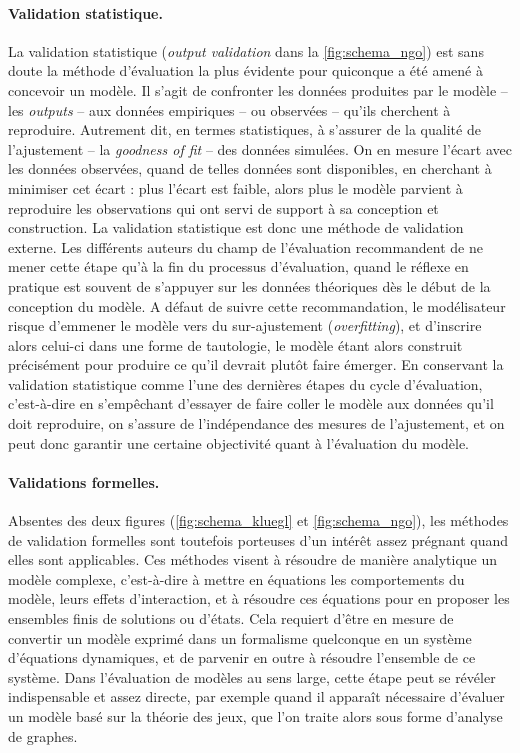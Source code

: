 \paragraph{Validation statistique.}
La validation statistique (\og \textit{output validation}\fg{} dans la \cref{fig:schema_ngo}) est sans doute la méthode d'évaluation la plus évidente pour quiconque a été amené à concevoir un modèle. Il s'agit de confronter les données produites par le modèle -- les \textit{outputs} --
aux données empiriques -- ou observées -- qu'ils cherchent à reproduire.
Autrement dit, en termes statistiques, à s'assurer de la qualité de l'ajustement -- la \textit{goodness of fit} -- des données simulées.
On en mesure l'écart avec les données observées, quand de telles données sont disponibles, en cherchant à minimiser cet écart :
	plus l'écart est faible, alors plus le modèle parvient à reproduire les observations qui ont servi de support à sa conception et construction.
La validation statistique est donc une méthode de validation externe.
Les différents auteurs du champ de l'évaluation recommandent de ne mener cette étape qu'à la fin du processus d'évaluation, quand le réflexe en pratique est souvent de s'appuyer sur les données théoriques dès le début de la conception du modèle.
A défaut de suivre cette recommandation, le modélisateur risque d'emmener le modèle vers du \og sur-ajustement \fg{} (\textit{overfitting}), et d'inscrire alors celui-ci dans une forme de tautologie, le modèle étant alors construit précisément pour produire ce qu'il devrait plutôt faire émerger.
En conservant la validation statistique comme l'une des dernières étapes du cycle d'évaluation, c'est-à-dire en s'empêchant d'essayer de faire coller le modèle aux données qu'il doit reproduire, on s'assure de l'indépendance des mesures de l'ajustement, et on peut donc garantir une certaine objectivité quant à l'évaluation du modèle.

\paragraph{Validations formelles.}
Absentes des deux figures (\ref{fig:schema_kluegl} et \ref{fig:schema_ngo}), les méthodes de validation formelles sont toutefois porteuses d'un intérêt assez prégnant quand elles sont applicables.
Ces méthodes visent à résoudre de manière analytique un modèle complexe, c'est-à-dire à mettre en équations les comportements du modèle, leurs effets d'interaction, et à résoudre ces équations pour en proposer les ensembles finis de solutions ou d'états.
Cela requiert d'être en mesure de convertir un modèle exprimé dans un formalisme quelconque en un système d'équations dynamiques, et de parvenir en outre à résoudre l'ensemble de ce système.
Dans l'évaluation de modèles au sens large, cette étape peut se révéler indispensable et assez directe, par exemple quand il apparaît nécessaire d'évaluer un modèle basé sur la théorie des jeux, que l'on traite alors sous forme d'analyse de graphes.

